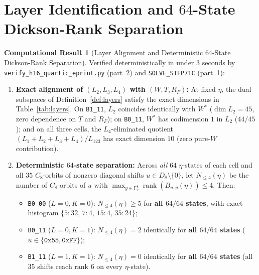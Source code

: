 \documentclass[11pt,a4paper]{article}
\theoremstyle{definition}
\newtheorem{compresult}[theorem]{Computational Result}
\newcommand{\F}{\mathbb{F}_2}
\newcommand{\rk}{\operatorname{rank}}
\begin{document}
\section{Layer Identification and $64$-State Dickson-Rank Separation}
\label{sec:phase_transition}

\begin{compresult}[Layer Alignment and Deterministic $64$-State Dickson-Rank Separation]
\label{res:phase_transition}
Verified deterministically in under $3$ seconds by \texttt{verify\_h16\_quartic\_eprint.py} (part~2) and \texttt{SOLVE\_STEP71C} (part~1):
\begin{enumerate}
  \item \textbf{Exact alignment of $(L_2, L_3, L_4)$ with $(W, T, R_F)$:} At fixed $\eta$, the dual subspaces of Definition~\ref{def:layers} satisfy the exact dimensions in Table~\ref{tab:layers}. On \texttt{B1\_11}, $L_2$ coincides identically with $W^*$ ($\dim L_2 = 45$, zero dependence on $T$ and $R_F$); on \texttt{B0\_11}, $W^*$ has codimension $1$ in $L_2$ ($44/45$); and on all three cells, the $L_4$-eliminated quotient $(L_1+L_2+L_3+L_4)/L_{123}$ has exact dimension $10$ (zero pure-$W$ contribution).
  \item \textbf{Deterministic $64$-state separation:} Across \emph{all} $64$ $\eta$-states of each cell and all $35$ $C_8$-orbits of nonzero diagonal shifts $u \in D_8 \setminus \{0\}$, let $N_{\le 4}(\eta)$ be the number of $C_8$-orbits of $u$ with $\max_{y \in \F^8} \rk(B_{u,y}(\eta)) \le 4$. Then:
  \begin{itemize}
    \item \texttt{B0\_00} ($L=0, K=0$): $N_{\le 4}(\eta) \ge 5$ for \textbf{all $64/64$ states}, with exact histogram $\{5:32,\, 7:4,\, 15:4,\, 35:24\}$;
    \item \texttt{B0\_11} ($L=0, K=1$): $N_{\le 4}(\eta) = 2$ identically for \textbf{all $64/64$ states} ($u \in \{\texttt{0x55}, \texttt{0xFF}\}$);
    \item \texttt{B1\_11} ($L=1, K=1$): $N_{\le 4}(\eta) = 0$ identically for \textbf{all $64/64$ states} (all $35$ shifts reach rank $6$ on every $\eta$-state).
  \end{itemize}
\end{enumerate}
\end{compresult}
\end{document}
